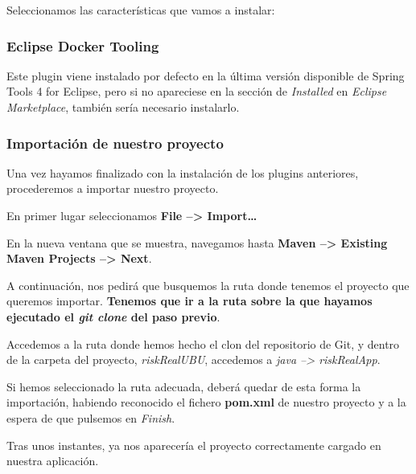 Seleccionamos las características que vamos a instalar:


\subsubsection{Eclipse Docker Tooling}

Este plugin viene instalado por defecto en la última versión disponible de Spring Tools 4 for Eclipse, pero si no apareciese en la sección de \textit{Installed} en \textit{Eclipse Marketplace}, también sería necesario instalarlo.



\subsubsection{Importación de nuestro proyecto}

Una vez hayamos finalizado con la instalación de los plugins anteriores, procederemos a importar nuestro proyecto.

En primer lugar seleccionamos \textbf{File --> Import\dots}


En la nueva ventana que se muestra, navegamos hasta \textbf{Maven --> Existing Maven Projects --> Next}.


A continuación, nos pedirá que busquemos la ruta donde tenemos el proyecto que queremos importar. \textbf{Tenemos que ir a la ruta sobre la que hayamos ejecutado el \textit{git clone} del paso previo}.

Accedemos a la ruta donde hemos hecho el clon del repositorio de Git, y dentro de la carpeta del proyecto, \textit{riskRealUBU}, accedemos a \textit{java --> riskRealApp}.

Si hemos seleccionado la ruta adecuada, deberá quedar de esta forma la importación, habiendo reconocido el fichero \textbf{pom.xml} de nuestro proyecto y a la espera de que pulsemos en \textit{Finish}.


Tras unos instantes, ya nos aparecería el proyecto correctamente cargado en nuestra aplicación.

